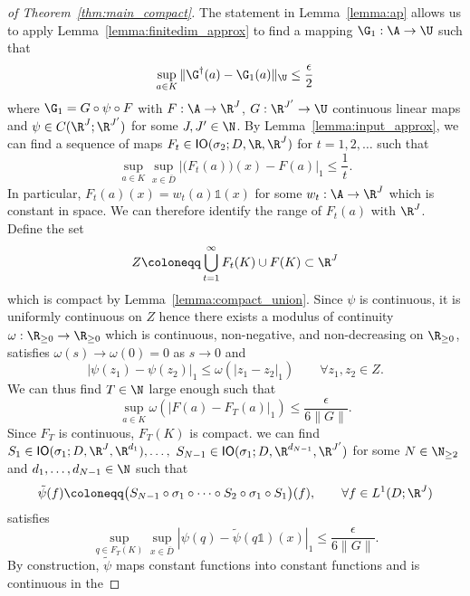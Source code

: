 \begin{proof}[of Theorem~\ref{thm:main_compact}]
The statement in Lemma~\ref{lemma:ap} allows us to apply Lemma~\ref{lemma:finitedim_approx} to find a mapping \(\G_1 : \A \to \U\) 
such that
\[\sup_{a \in K} \|\G^\dagger (a) - \G_1(a)\|_{\U} \leq \frac{\epsilon}{2}\]
where \(\G_1 = G \circ \psi \circ F\) with \(F : \A \to \R^J\), \(G : \R^{J'} \to \U\) continuous linear maps  and \(\psi \in C(\R^{J};\R^{J'})\) for some \(J, J' \in \N\).
By Lemma~\ref{lemma:input_approx}, we can find a sequence of maps \(F_t \in \mathsf{IO}(\sigma_2;D,\R,\R^J)\) for \(t=1,2,\dots\) such that
\[\sup_{a \in K} \sup_{x \in \bar{D}} | \bigl (F_t (a) \bigl )(x) - F (a)|_1 \leq \frac{1}{t}.\]
In particular, \(F_t(a)(x) = w_t(a) \mathds{1}(x)\) for some \(w_t : \A \to \R^J\)
which is constant in space.
We can therefore identify the range of $F_t(a)$ with \(\R^J\).
Define the set 
\[Z \coloneqq \bigcup_{t = 1}^\infty F_t (K) \cup F (K) \subset \R^{J}\]
which is compact by Lemma~\ref{lemma:compact_union}.
Since \(\psi\) is continuous, it is uniformly continuous on \(Z\) hence there exists a modulus of continuity \(\omega : \R_{\geq 0} \to \R_{\geq 0}\) which is continuous, non-negative, and non-decreasing on \(\R_{\geq 0}\), satisfies \(\omega(s) \to \omega(0) = 0\) as \(s \to 0\) and
\[|\psi(z_1) - \psi(z_2)|_1 \leq \omega ( |z_1 - z_2|_1 ) \qquad \forall z_1, z_2 \in Z.\]
We can thus find \(T \in \N\) large enough such that
\[\sup_{a \in K} \omega (|F (a) - F_T (a)|_1) \leq \frac{\epsilon}{6 \|G\|}.\]
Since \(F_T\) is continuous, \(F_T (K)\) is compact.  we can find 
\(S_1 \in \mathsf{IO}(\sigma_1;D,\R^J,\R^{d_1}), \dots,\) \(S_{N-1} \in \mathsf{IO}(\sigma_1;D,\R^{d_{N-1}},\R^{J'})\) for some \(N \in \N_{\geq 2}\) 
and \(d_1,\dots,d_{N-1} \in \N\) such that
\[\tilde{\psi}(f) \coloneqq \bigl ( S_{N-1} \circ \sigma_1 \circ \dots \circ S_2 \circ \sigma_1 \circ S_1 \bigl)(f), \qquad \forall f \in L^1(D;\R^J) \]
satisfies
\[\sup_{q \in F_T (K)} \sup_{x \in \bar{D}}  | \psi(q) - \tilde{\psi}(q \mathds{1})(x) |_1 \leq \frac{\epsilon}{6 \|G\|}. \]
By construction, \(\tilde{\psi}\) maps constant functions into constant functions and is continuous in the 

\end{proof}
